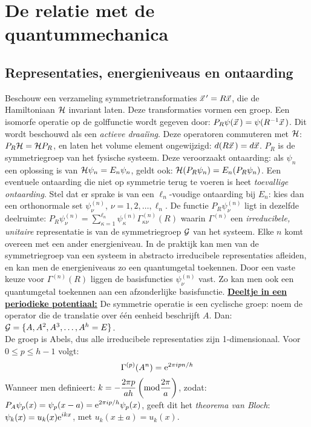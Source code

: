 \documentclass[twoside]{report}
\begin{document}
\section{De relatie met de quantummechanica}
\subsection{Representaties, energieniveaus en ontaarding}
Beschouw een verzameling symmetrietransformaties $\vec{x}\,'=R\vec{x}$, die de
Hamiltoniaan ${\cal{H}}$ invariant laten. Deze transformaties vormen een groep. Een
isomorfe operatie op de golffunctie wordt gegeven door:
$P_R\psi(\vec{x}\,)=\psi(R^{-1}\vec{x}\,)$. Dit wordt beschouwd als een
{\it actieve draai\"{\i}ng}. Deze operatoren commuteren met ${\cal{H}}$:
$P_R{{\cal{H}}}={{\cal{H}}}P_R$, en laten het volume element ongewijzigd:
$d(R\vec{x}\,)=d\vec{x}$.
\npar
$P_R$ is de symmetriegroep van het fysische systeem. Deze veroorzaakt ontaarding:
als $\psi_n$ een oplossing is van ${{\cal{H}}}\psi_n=E_n\psi_n$, geldt ook:
${{\cal{H}}}(P_R\psi_n)=E_n(P_R\psi_n)$. Een eventuele ontaarding die niet op
symmetrie terug te voeren is heet {\it toevallige ontaarding}.
\npar
Stel dat er sprake is van een $\ell_n$-voudige ontaarding bij $E_n$: kies dan
een orthonormale set $\psi^{(n)}_{\nu}$, $\nu=1,2,\ldots,\ell_n$.
De functie $P_R\psi^{(n)}_{\nu}$ ligt in dezelfde deelruimte:
$\displaystyle P_R\psi^{(n)}_{\nu}=\sum_{\kappa=1}^{\ell_n}\psi^{(n)}_{\kappa}
\Gamma^{(n)}_{\kappa\nu}(R)$
\npar
waarin $\Gamma^{(n)}$ een {\it irreducibele, unitaire} representatie is van de
symmetriegroep ${\cal{G}}$ van het systeem. Elke $n$ komt overeen met een ander energieniveau.
In de praktijk kan men van de symmetriegroep van een systeem in abstracto
irreducibele representaties afleiden, en kan men de energieniveaus zo een
quantumgetal toekennen. Door een vaste keuze voor $\Gamma^{(n)}(R)$ liggen de
basisfuncties $\psi^{(n)}_{\nu}$ vast. Zo kan men ook een quantumgetal
toekennen aan een afzonderlijke basisfunctie.
\npar
\underline{\bf Deeltje in een periodieke potentiaal:} De symmetrie operatie
is een cyclische groep: noem de operator die de translatie over \'e\'en
eenheid beschrijft $A$. Dan: ${\cal{G}}=\{A,A^2,A^3,\ldots,A^h=E\}$.\\
De groep is Abels, dus alle irreducibele representaties zijn 1-dimensionaal.
Voor $0\leq p\leq h-1$ volgt:
\[
\Gamma^{(p)}(A^n)={\rm e}^{2\pi ipn/h}
\]
Wanneer men definieert: $\displaystyle k=-\frac{2\pi p}{ah}
\left({\rm mod}\frac{2\pi}{a}\right)$, zodat:
$\displaystyle P_A\psi_p(x)=\psi_p(x-a)={\rm e}^{2\pi ip/h}\psi_p(x)$,
geeft dit het {\it theorema van Bloch}:
$\displaystyle \psi_k(x)=u_k(x){\rm e}^{ikx}$, met $u_k(x\pm a)=u_k(x)$.
\end{document}
